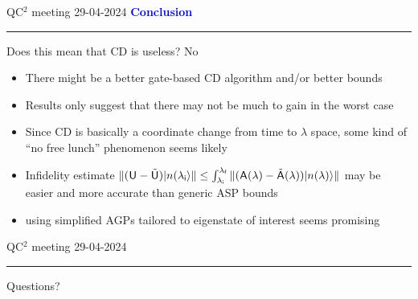 \documentclass{beamer}
\def\lbt{\small QC$^2$ meeting 29-04-2024} %
\def\mt#1{\kern0.025em\mathsf{#1}\kern0.025em}
\def\lambdai{{\lambda_{\sf i}}}
\def\lambdaf{{\lambda_{\sf f}}}
\newenvironment{dia}[2]
{
	\begin{frame}
	\vspace{1mm}
	{\small #1}
	\hfill
    {\small\bf\textcolor{blue}{#2}}
	\vspace{3mm}
	\hrule
	\bigskip
}
{
	\vfill
	\end{frame}
}
\begin{document}
\begin{dia}{\lbt}{Conclusion}
Does this mean that CD is useless? \pause No \pause
\begin{itemize}
    \item There might be a better gate-based CD algorithm and/or better bounds \pause
    \item Results only suggest that there may not be much to gain in the worst case \pause
    \item Since CD is basically a coordinate change from time to $\lambda$ space, some kind of ``no free lunch'' phenomenon seems likely \pause
    \item Infidelity estimate $\|(\mt U - \tilde{\mt U})\ket{n(\lambdai}\| \leq \int_\lambdai^\lambdaf \|(\mt A(\lambda) - \tilde{\mt A}(\lambda))\ket{n(\lambda)}\|$ may be easier and more accurate than generic ASP bounds \pause
    \item using simplified AGPs tailored to eigenstate of interest seems promising
\end{itemize}

\vspace{-1cm}
\end{dia}

\begin{dia}{\lbt}{}
\vspace{2.5cm}
\begin{center}
\begin{LARGE}
\textcolor{mygreen}{Questions?}
\end{LARGE}
\end{center}
\vspace*{1.5cm}
\end{dia}
\end{document}
